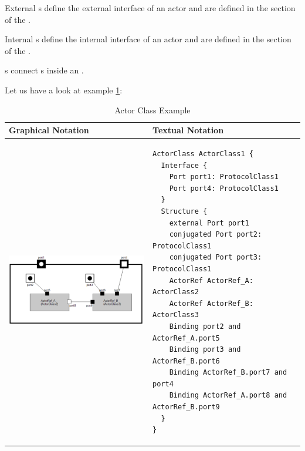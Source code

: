 External s define the external interface of an actor and are defined in the  
section of the .

Internal s define the internal interface of an actor and are defined in the  
section of the .

s connect s inside an .

Let us have a look at example \ref{tab:actor_class_example}:

\begin{table}
\caption{Actor Class Example}
\label{tab:actor_class_example}
\begin{tabular}{|l|l|l|}
\hline
 \textbf{Graphical Notation} & \textbf{Textual Notation} \\ \hline
 \includegraphics[scale=0.7]{images/040-ActorClass.png} & 
  \begin{lstlisting}
ActorClass ActorClass1 {
  Interface {
    Port port1: ProtocolClass1
    Port port4: ProtocolClass1
  }
  Structure {
    external Port port1
    conjugated Port port2: ProtocolClass1
    conjugated Port port3: ProtocolClass1
    ActorRef ActorRef_A: ActorClass2
    ActorRef ActorRef_B: ActorClass3
    Binding port2 and ActorRef_A.port5
    Binding port3 and ActorRef_B.port6
    Binding ActorRef_B.port7 and port4
    Binding ActorRef_A.port8 and ActorRef_B.port9
  }
}
  \end{lstlisting}
\\ \hline
 \end{tabular}
 \end{table}


